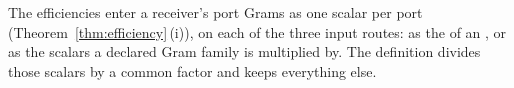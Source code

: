 
The efficiencies enter a receiver's port Grams as one scalar per port
(Theorem~\ref{thm:efficiency}\,(i)), on each of the three input routes: as
the  of an , or as
the scalars a declared Gram family is multiplied by. The definition divides
those scalars by a common factor and keeps everything else.

